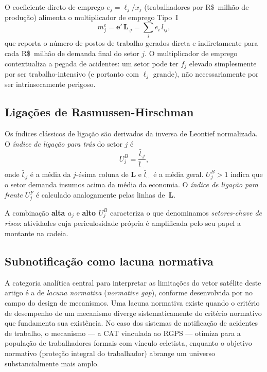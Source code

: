 \documentclass[12pt, a4paper]{article}
\begin{document}
O coeficiente direto de emprego $e_j = \ell_j / x_j$ (trabalhadores
por R\$~milhão de produção) alimenta o multiplicador de emprego Tipo~I
%
\begin{equation}
m^e_j = \mathbf{e}'\, \mathbf{L}_{\cdot j} = \sum_i e_i\, l_{ij},
\label{eq:mult_emprego}
\end{equation}
%
que reporta o número de postos de trabalho gerados direta e
indiretamente para cada R\$~milhão de demanda final do setor $j$.
O multiplicador de emprego contextualiza a pegada de acidentes: um
setor pode ter $f_j$ elevado simplesmente por ser trabalho-intensivo
(e portanto com $\ell_j$ grande), não necessariamente por ser
intrinsecamente perigoso.

\subsection{Ligações de Rasmussen-Hirschman}

Os índices clássicos de ligação \citep{rasmussen1956studies} são
derivados da inversa de Leontief normalizada. O \textit{índice de
ligação para trás} do setor $j$ é
%
\begin{equation}
U_j^B = \frac{\bar{l}_{\cdot j}}{\bar{l}_{\cdot\cdot}},
\label{eq:linkage_back}
\end{equation}
%
onde $\bar{l}_{\cdot j}$ é a média da $j$-ésima coluna de $\mathbf{L}$
e $\bar{l}_{\cdot\cdot}$ é a média geral. $U_j^B > 1$ indica que o setor
demanda insumos acima da média da economia. O \textit{índice de ligação
para frente} $U_j^F$ é calculado analogamente pelas linhas de~$\mathbf{L}$.

A combinação \textbf{alta $a_j$} e \textbf{alto $U_j^B$} caracteriza o
que denominamos \textit{setores-chave de risco}: atividades cuja
periculosidade própria é amplificada pelo seu papel a montante na cadeia.

\subsection{Subnotificação como lacuna normativa}

A categoria analítica central para interpretar as limitações do vetor
satélite deste artigo é a de \textit{lacuna normativa}
(\textit{normative gap}), conforme desenvolvida por
\citet{hitzig2020normative} no campo do design de mecanismos. Uma
lacuna normativa existe quando o critério de desempenho de um mecanismo
diverge sistematicamente do critério normativo que fundamenta sua
existência. No caso dos sistemas de notificação de acidentes de
trabalho, o mecanismo --- a CAT vinculada ao RGPS --- otimiza para a
população de trabalhadores formais com vínculo celetista, enquanto o
objetivo normativo (proteção integral do trabalhador) abrange um
universo substancialmente mais amplo.
\end{document}
